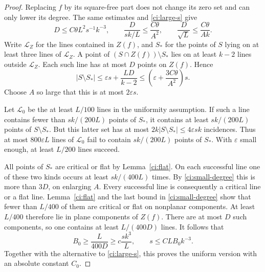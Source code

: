\begin{proof}
Replacing $f$ by its square-free part does not change its zero set
and can only lower its degree.  The same estimates and
\eqref{ci:large-s} give
\begin{equation}\label{ci:small-degree}
 D\le C\theta L^2s^{-1}k^{-3},\qquad
 \frac D{sk/L}\le\frac{C\theta}{A^2},\qquad
 \frac D{\sqrt L}\le\frac{C\theta}{Ak}.
\end{equation}
Write $\mathcal L_Z$ for the lines contained in $Z(f)$, and $S_*$ for
the points of $S$ lying on at least three lines of $\mathcal L_Z$.
A point of $(S\cap Z(f))\setminus S_*$ lies on at least $k-2$ lines
outside $\mathcal L_Z$.  Each such line has at most $D$ points on
$Z(f)$.  Hence
\[
 |S\setminus S_*|\le\varepsilon s+\frac{LD}{k-2}
 \le\left(\varepsilon+\frac{3C\theta}{A^2}\right)s.
\]
Choose $A$ so large that this is at most $2\varepsilon s$.

Let $\mathcal L_0$ be the at least $L/100$ lines in the uniformity
assumption.  If such a line contains fewer than $sk/(200L)$ points
of $S_*$, it contains at least $sk/(200L)$ points of $S\setminus S_*$.
But this latter set has at most $2k|S\setminus S_*|\le4\varepsilon sk$
incidences.  Thus at most $800\varepsilon L$ lines of
$\mathcal L_0$ fail to contain $sk/(200L)$ points of $S_*$.  With
$\varepsilon$ small enough, at least $L/200$ lines succeed.

All points of $S_*$ are critical or flat by Lemma~\ref{ci:flat}.
On each successful line one of these two kinds occurs at least
$sk/(400L)$ times.  By \eqref{ci:small-degree} this is more than
$3D$, on enlarging $A$.  Every successful line is consequently a
critical line or a flat line.  Lemma~\ref{ci:flat} and the last bound
in \eqref{ci:small-degree} show that fewer than $L/400$ of them are
critical or flat on nonplanar components.  At least $L/400$ therefore
lie in plane components of $Z(f)$.  There are at most $D$ such
components, so one contains at least $L/(400D)$ lines.  It follows
that
\[
 B_0\ge\frac L{400D}\ge c\frac{sk^3}{L},
 \qquad s\le C LB_0k^{-3}.
\]
Together with the alternative to \eqref{ci:large-s}, this proves the
uniform version with an absolute constant $C_0$.


\end{proof}
